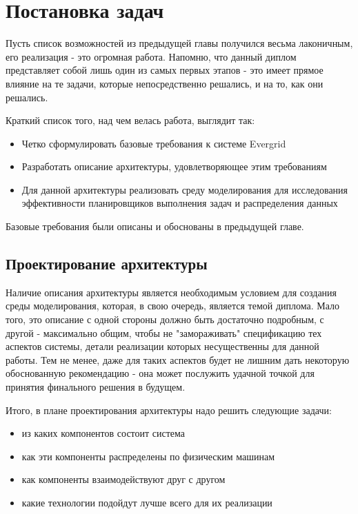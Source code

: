\chapter{Постановка задач}

Пусть список возможностей из предыдущей главы получился весьма лаконичным, его реализация - это огромная работа. Напомню, что данный диплом представляет собой лишь один из самых первых этапов - это имеет прямое влияние на те задачи, которые непосредственно решались, и на то, как они решались.

Краткий список того, над чем велась работа, выглядит так:

\begin{itemize}
	\item Четко сформулировать базовые требования к системе Evergrid
	\item Разработать описание архитектуры, удовлетворяющее этим требованиям
	\item Для данной архитектуры реализовать среду моделирования для исследования эффективности планировщиков выполнения задач и распределения данных
\end{itemize}


Базовые требования были описаны и обоснованы в предыдущей главе.

\section{Проектирование архитектуры}

Наличие описания архитектуры является необходимым условием для создания среды моделирования, которая, в свою очередь, является темой диплома. Мало того, это описание с одной стороны должно быть достаточно подробным, с другой - максимально общим, чтобы не "замораживать" спецификацию тех аспектов системы, детали реализации которых несущественны для данной работы. Тем не менее, даже для таких аспектов будет не лишним дать некоторую обоснованную рекомендацию - она может послужить удачной точкой для принятия финального решения в будущем.

Итого, в плане проектирования архитектуры надо решить следующие задачи:

\begin{itemize}
	\item из каких компонентов состоит система
	\item как эти компоненты распределены по физическим машинам
	\item как компоненты взаимодействуют друг с другом
	\item какие технологии подойдут лучше всего для их реализации
\end{itemize}

